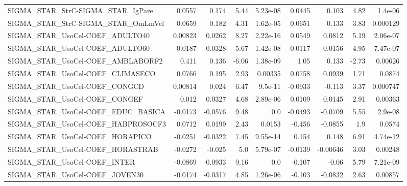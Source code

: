 \begin{tabular}{lrrrrrrrr}
SIGMA\_STAR\_StrC-SIGMA\_STAR\_IgPare      &      0.0557 &        0.174 &    5.44 & 5.23e-08 &     0.0445 &       0.103 &         4.82 &       1.4e-06 \\
SIGMA\_STAR\_StrC-SIGMA\_STAR\_OmLmVel     &      0.0659 &        0.182 &    4.31 & 1.62e-05 &     0.0651 &       0.133 &         3.83 &      0.000129 \\
SIGMA\_STAR\_UsoCel-COEF\_ADULTO40        &     0.00823 &       0.0262 &    8.27 & 2.22e-16 &     0.0549 &      0.0812 &         5.19 &      2.06e-07 \\
SIGMA\_STAR\_UsoCel-COEF\_ADULTO60        &      0.0187 &       0.0328 &    5.67 & 1.42e-08 &    -0.0117 &     -0.0156 &         4.95 &      7.47e-07 \\
SIGMA\_STAR\_UsoCel-COEF\_AMBLABORF2      &       0.411 &        0.136 &   -6.06 & 1.38e-09 &       1.05 &       0.133 &        -2.73 &       0.00626 \\
SIGMA\_STAR\_UsoCel-COEF\_CLIMASECO       &      0.0766 &        0.195 &    2.93 &  0.00335 &     0.0758 &      0.0939 &         1.71 &        0.0874 \\
SIGMA\_STAR\_UsoCel-COEF\_CONGCD          &     0.00814 &        0.024 &    6.47 &  9.5e-11 &    -0.0933 &      -0.113 &         3.37 &      0.000747 \\
SIGMA\_STAR\_UsoCel-COEF\_CONGEF          &       0.012 &       0.0327 &    4.68 & 2.89e-06 &     0.0109 &      0.0145 &         2.91 &       0.00363 \\
SIGMA\_STAR\_UsoCel-COEF\_EDUC\_BASICA     &     -0.0173 &      -0.0576 &    9.48 &      0.0 &    -0.0493 &     -0.0709 &         5.55 &       2.9e-08 \\
SIGMA\_STAR\_UsoCel-COEF\_HABPROSOCF3     &      0.0712 &       0.0199 &    2.43 &   0.0153 &     -0.456 &     -0.0855 &          1.9 &        0.0574 \\
SIGMA\_STAR\_UsoCel-COEF\_HORAPICO        &     -0.0251 &      -0.0322 &    7.45 & 9.55e-14 &      0.154 &       0.148 &         6.91 &      4.74e-12 \\
SIGMA\_STAR\_UsoCel-COEF\_HORASTRAB       &     -0.0272 &       -0.025 &     5.0 & 5.79e-07 &    -0.0139 &    -0.00646 &         3.03 &       0.00248 \\
SIGMA\_STAR\_UsoCel-COEF\_INTER           &     -0.0869 &      -0.0933 &    9.16 &      0.0 &     -0.107 &       -0.06 &         5.79 &      7.21e-09 \\
SIGMA\_STAR\_UsoCel-COEF\_JOVEN30         &     -0.0174 &      -0.0317 &    4.85 & 1.26e-06 &     -0.103 &     -0.0832 &         2.63 &       0.00857 \\

\end{tabular}
